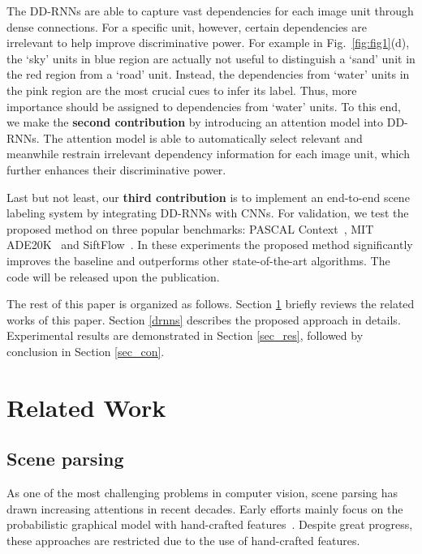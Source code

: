 \documentclass[10pt,twocolumn,letterpaper]{article}
\begin{document}
The DD-RNNs are able to capture vast dependencies for each image unit through dense connections. For a specific unit, however, certain dependencies are irrelevant to help improve discriminative power. For example in Fig.~\ref{fig:fig1}(d), the `sky' units in blue region are actually not useful to distinguish a `sand' unit in the red region from a `road' unit. Instead, the dependencies from `water' units in the pink region are the most crucial cues to infer its label. Thus, more importance should be assigned to dependencies from `water' units. To this end, we make the {\bf second contribution} by introducing an attention model into DD-RNNs. The attention model is able to automatically select relevant and meanwhile restrain irrelevant dependency information for each image unit, which further enhances their discriminative power.

Last but not least, our {\bf third contribution} is to implement an end-to-end scene labeling system by integrating DD-RNNs with CNNs. For validation, we test the proposed method on three popular benchmarks: PASCAL Context~\cite{mottaghi2014role}, MIT ADE20K~\cite{zhou2017scene} and SiftFlow~\cite{liu2011sift}. In these experiments the proposed method significantly improves the baseline and outperforms other state-of-the-art algorithms. %
The code will be released upon the publication.

The rest of this paper is organized as follows. Section \ref{sec_rel} briefly reviews the related works of this paper. Section \ref{drnns} describes the proposed approach in details. Experimental results are demonstrated in Section \ref{sec_res}, followed by conclusion in Section \ref{sec_con}.

\section{Related Work}
\label{sec_rel}

\subsection{Scene parsing}

As one of the most challenging problems in computer vision, scene parsing has drawn increasing attentions in recent decades. Early efforts mainly focus on the probabilistic graphical model with hand-crafted features~\cite{liu2011sift,tighe2013finding,yang2014context,gould2009decomposing}. Despite great progress, these approaches are restricted due to the use of hand-crafted features.
\end{document}
